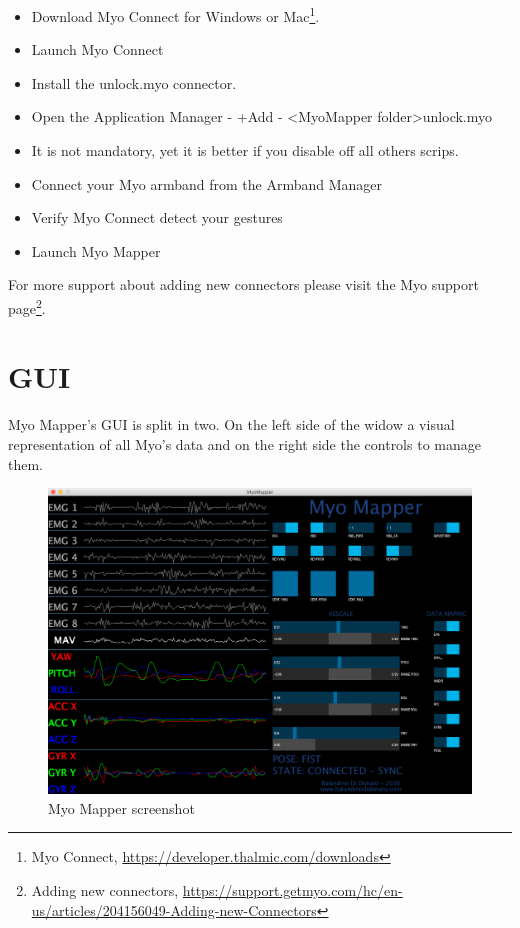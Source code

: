 \documentclass[12pt,a4paper]{article}
\begin{document}
\begin{itemize}
	\item Download Myo Connect for Windows or Mac\footnote{Myo Connect, \url{https://developer.thalmic.com/downloads}}.
	\item Launch Myo Connect
	\item Install the unlock.myo connector.
	\item Open the Application Manager
	\subitem - +Add 
	\subitem - \textless MyoMapper folder\textgreater \textfractionsolidus unlock.myo
	\item It is not mandatory, yet it is better if you disable off all others scrips.
	\item Connect your Myo armband from the Armband Manager
	\item Verify Myo Connect detect your gestures
	\item Launch Myo Mapper
\end{itemize}

For more support about adding new connectors please visit the Myo support page\footnote{Adding new connectors, \url{https://support.getmyo.com/hc/en-us/articles/204156049-Adding-new-Connectors}}.

\newpage

\section{GUI}

	Myo Mapper's GUI is split in two. On the left side of the widow a visual representation of all Myo's data and on the right side the controls to manage them.
	
	\begin{figure}[h]
		\centering
		\includegraphics[width=1\linewidth]{../images/MyoMapper}
		\caption{Myo Mapper screenshot}
		\label{fig:MyoMapperGUI}
	\end{figure}
	
\end{document}
